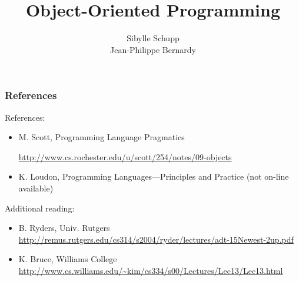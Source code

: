 \documentclass{beamer}
\title[OOP]
{Object-Oriented Programming}
\subtitle{} %
\author[Jean-Philippe Bernardy] %
{Sibylle Schupp\inst{2} \\
Jean-Philippe Bernardy\inst{1}}
\institute
{
  \inst{1}%
  Department of Computing Science\\
  Chalmers University of Technology\\
  \inst{2}%
  Institute for Software Systems\\
  Hamburg University of Technology
}
\date%
\begin{document}
\begin{frame}
  \titlepage
\end{frame}

\begin{frame}[fragile]
\frametitle{References}
References:
\begin{itemize}
\item M. Scott, Programming Language Pragmatics

\url{http://www.cs.rochester.edu/u/scott/254/notes/09-objects}
\item K. Loudon, Programming Languages---Principles and Practice
(not on-line available)
\end{itemize}

Additional reading:
\begin{itemize}
\item B. Ryders, Univ. Rutgers
\url{
http://remus.rutgers.edu/cs314/s2004/ryder/lectures/adt-15Newest-2up.pdf
}
%
\item K. Bruce, Williams College
\url{
http://www.cs.williams.edu/~kim/cs334/s00/Lectures/Lec13/Lec13.html}
\end{itemize}
\end{frame}

\end{document}
